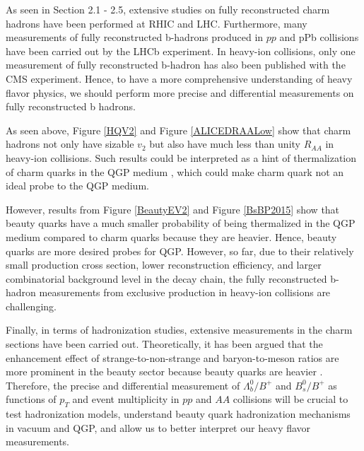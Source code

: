 As seen in Section 2.1 - 2.5, extensive studies on fully reconstructed charm hadrons have been performed at RHIC and LHC. Furthermore, many measurements of fully reconstructed b-hadrons produced in $pp$ and pPb collisions have been carried out by the LHCb experiment. In heavy-ion collisions, only one measurement of fully reconstructed b-hadron has also been published with the CMS experiment. Hence, to have a more comprehensive understanding of heavy flavor physics, we should perform more precise and differential measurements on fully reconstructed b hadrons. 


As seen above, Figure \ref{HQV2} and Figure \ref{ALICEDRAALow} show that charm hadrons not only have sizable $v_2$ but also have much less than unity $R_{AA}$ in heavy-ion collisions. Such results could be interpreted as a hint of thermalization of charm quarks in the QGP medium \cite{CharmThermal}, which could make charm quark not an ideal probe to the QGP medium. 

However, results from Figure \ref{BeautyEV2} and Figure \ref{BsBP2015} show that beauty quarks have a much smaller probability of being thermalized in the QGP medium compared to charm quarks because they are heavier. Hence, beauty quarks are more desired probes for QGP. However, so far, due to their relatively small production cross section, lower reconstruction efficiency, and larger combinatorial background level in the decay chain, the fully reconstructed b-hadron measurements from exclusive production in heavy-ion collisions are challenging.

Finally, in terms of hadronization studies, extensive measurements in the charm sections have been carried out. Theoretically, it has been argued that the enhancement effect of strange-to-non-strange and baryon-to-meson ratios are more prominent in the beauty sector because beauty quarks are heavier \cite{BaryontoMeson}. Therefore, the precise and differential measurement of $\Lambda_b^0/B^+$ and $B^0_s/B^+$ as functions of $p_T$ and event multiplicity in $pp$ and $AA$ collisions will be crucial to test hadronization models, understand beauty quark hadronization mechanisms in vacuum and QGP, and allow us to better interpret our heavy flavor measurements.

